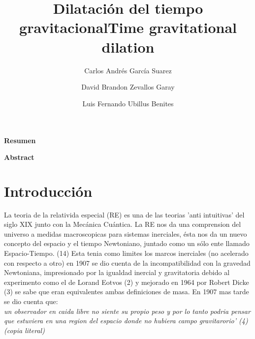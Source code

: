 \documentclass[12pt,twoside]{rif}
\title{\textbf{Dilatación del tiempo gravitacional}}
\author[1]{{\small Carlos Andrés García Suarez}}
\author[1]{{\small David Brandon Zevallos Garay}}
\author[1]{{\small Luis Fernando Ubillus Benites}}
\affil[1]{{ \small Facultad de Ciencias Naturales y Matemática, Universidad
		Nacional Federico Villarreal. El Agustino 15003. Lima-Perú.}}
\date{}
\begin{document}
	\maketitle
	
	\begin{res}
		\begin{center}
			\textbf{Resumen} \\
		\end{center}
		\lipsum[2]
		
		\par
		\smallskip
	\end{res}
	\begin{center}
		\title{\textbf{Time gravitational dilation}}
	\end{center}
	
	\begin{abst}
		\begin{center}
			\textbf{Abstract} \\
		\end{center}
		\lipsum[2]
		
		\par 
		\smallskip
	\end{abst}

	
	
	\newpage
	
	\tableofcontents
	
	\section{ Introducción} 
	La teoria de la relativida especial (RE) es una de las teorias 'anti intuitivas' del siglo XIX junto con la Mecánica
Cuántica. La RE nos da una comprension del universo a medidas macroscopicas para sistemas inerciales, ésta nos da un nuevo
concepto del espacio y el tiempo Newtoniano, juntado como un sólo ente llamado Espacio-Tiempo. (14)
Esta tenia como limites los marcos inerciales (no acelerado con respecto a otro) en 1907 se dio cuenta de la
incompatibilidad con la gravedad Newtoniana, impresionado por la igualdad inercial y gravitatoria debido al experimento 
como el de Lorand Eotvos (2) y mejorado en 1964 por Robert Dicke (3) se sabe que eran equivalentes ambas definiciones de masa.
En 1907 mas tarde se dio cuenta que: \\

 \textit{un observador en caida libre no siente su propio peso y por lo tanto podria pensar que estuviera en una region del espacio donde no hubiera campo gravitarorio' (4) (copia literal)}\\
\end{document}

